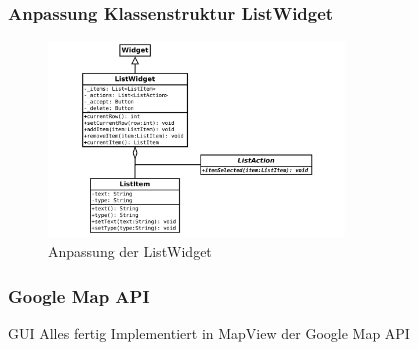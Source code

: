 %
%
%
\begin{frame}
	\frametitle{Anpassung Klassenstruktur ListWidget}
%
	\begin{figure}
		\centering
		\includegraphics[width = 0.7\textwidth]{../grafiken/uml-list-widget-2}
		\caption{Anpassung der ListWidget}
	\end{figure}
\end{frame}
%
%
%
\begin{frame}
	\frametitle{Google Map API}
%
	\begin{block}{GUI}
		Alles fertig Implementiert in MapView der Google Map API
	\end{block}
\end{frame}